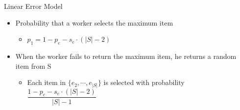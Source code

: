 \documentclass{beamer}
\begin{document}

\begin{frame}{Linear Error Model}
	\begin{itemize}
		\item Probability that a worker selects the maximum item
			\begin{itemize}
				\item $p_1 = 1 − p_e − s_e \cdot (\left\vert{S}\right\vert − 2)$
			\end{itemize}
			\pause\vspace{8pt}
		\item When the worker fails to return the maximum item, he returns a random item from S
		\begin{itemize}
				\item Each item in $\{e_2, \cdots, e_{\left\vert{S}\right\vert}\}$ is selected with probability
					\\
				\vspace{5pt}$\dfrac{1 − p_e − s_e \cdot (\left\vert{S}\right\vert − 2)}{\left\vert{S}\right\vert-1}$
		\end{itemize}
	\end{itemize}
\end{frame}
\end{document}
